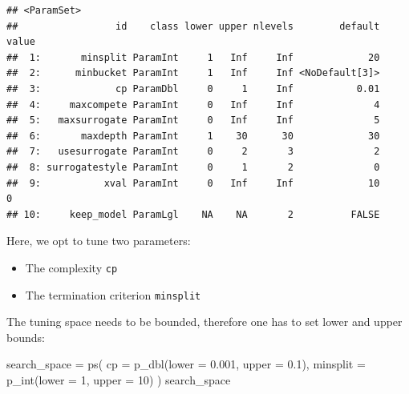 \documentclass[
]{scrbook}
\newenvironment{Shaded}{\begin{snugshade}}{\end{snugshade}}
\newcommand{\AttributeTok}[1]{\textcolor[rgb]{0.77,0.63,0.00}{#1}}
\newcommand{\DecValTok}[1]{\textcolor[rgb]{0.00,0.00,0.81}{#1}}
\newcommand{\FloatTok}[1]{\textcolor[rgb]{0.00,0.00,0.81}{#1}}
\newcommand{\FunctionTok}[1]{\textcolor[rgb]{0.00,0.00,0.00}{#1}}
\newcommand{\NormalTok}[1]{#1}
\newcommand{\OtherTok}[1]{\textcolor[rgb]{0.56,0.35,0.01}{#1}}
\newcommand{\SpecialCharTok}[1]{\textcolor[rgb]{0.00,0.00,0.00}{#1}}
\newcommand{\StringTok}[1]{\textcolor[rgb]{0.31,0.60,0.02}{#1}}
\providecommand{\tightlist}{%
  \setlength{\itemsep}{0pt}\setlength{\parskip}{0pt}}
\renewenvironment{Shaded} {\begin{snugshade}\small} {\end{snugshade}}
\begin{document}
\begin{Shaded}
\end{Shaded}

\begin{verbatim}
## <ParamSet>
##                 id    class lower upper nlevels        default value
##  1:       minsplit ParamInt     1   Inf     Inf             20      
##  2:      minbucket ParamInt     1   Inf     Inf <NoDefault[3]>      
##  3:             cp ParamDbl     0     1     Inf           0.01      
##  4:     maxcompete ParamInt     0   Inf     Inf              4      
##  5:   maxsurrogate ParamInt     0   Inf     Inf              5      
##  6:       maxdepth ParamInt     1    30      30             30      
##  7:   usesurrogate ParamInt     0     2       3              2      
##  8: surrogatestyle ParamInt     0     1       2              0      
##  9:           xval ParamInt     0   Inf     Inf             10     0
## 10:     keep_model ParamLgl    NA    NA       2          FALSE
\end{verbatim}

Here, we opt to tune two parameters:

\begin{itemize}
\tightlist
\item
  The complexity \texttt{cp}
\item
  The termination criterion \texttt{minsplit}
\end{itemize}

The tuning space needs to be bounded, therefore one has to set lower and upper bounds:

\begin{Shaded}
\begin{Highlighting}[]
\NormalTok{search\_space }\OtherTok{=} \FunctionTok{ps}\NormalTok{(}
  \AttributeTok{cp =} \FunctionTok{p\_dbl}\NormalTok{(}\AttributeTok{lower =} \FloatTok{0.001}\NormalTok{, }\AttributeTok{upper =} \FloatTok{0.1}\NormalTok{),}
  \AttributeTok{minsplit =} \FunctionTok{p\_int}\NormalTok{(}\AttributeTok{lower =} \DecValTok{1}\NormalTok{, }\AttributeTok{upper =} \DecValTok{10}\NormalTok{)}
\NormalTok{)}
\NormalTok{search\_space}
\end{Highlighting}
\end{Shaded}
\end{document}
